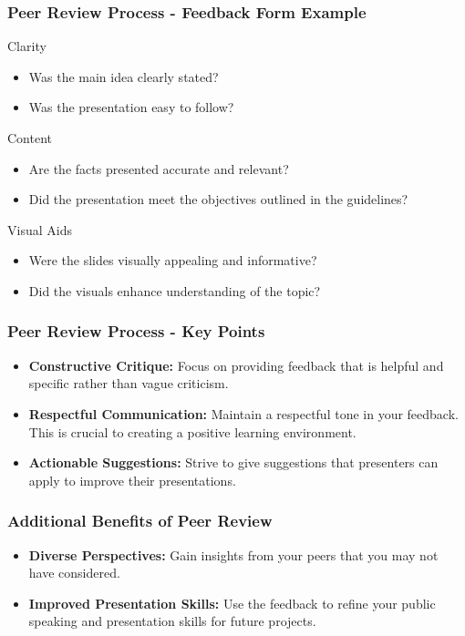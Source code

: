 \documentclass[aspectratio=169]{beamer}
\begin{document}
\begin{frame}[fragile]
    \frametitle{Peer Review Process - Feedback Form Example}
    \begin{block}{Clarity}
        \begin{itemize}
            \item Was the main idea clearly stated?
            \item Was the presentation easy to follow?
        \end{itemize}
    \end{block}
    
    \begin{block}{Content}
        \begin{itemize}
            \item Are the facts presented accurate and relevant?
            \item Did the presentation meet the objectives outlined in the guidelines?
        \end{itemize}
    \end{block}
    
    \begin{block}{Visual Aids}
        \begin{itemize}
            \item Were the slides visually appealing and informative?
            \item Did the visuals enhance understanding of the topic?
        \end{itemize}
    \end{block}
\end{frame}

\begin{frame}[fragile]
    \frametitle{Peer Review Process - Key Points}
    \begin{itemize}
        \item \textbf{Constructive Critique:} Focus on providing feedback that is helpful and specific rather than vague criticism.
        \item \textbf{Respectful Communication:} Maintain a respectful tone in your feedback. This is crucial to creating a positive learning environment.
        \item \textbf{Actionable Suggestions:} Strive to give suggestions that presenters can apply to improve their presentations.
    \end{itemize}
\end{frame}

\begin{frame}[fragile]
    \frametitle{Additional Benefits of Peer Review}
    \begin{itemize}
        \item \textbf{Diverse Perspectives:} Gain insights from your peers that you may not have considered.
        \item \textbf{Improved Presentation Skills:} Use the feedback to refine your public speaking and presentation skills for future projects.
    \end{itemize}
\end{frame}
\end{document}
